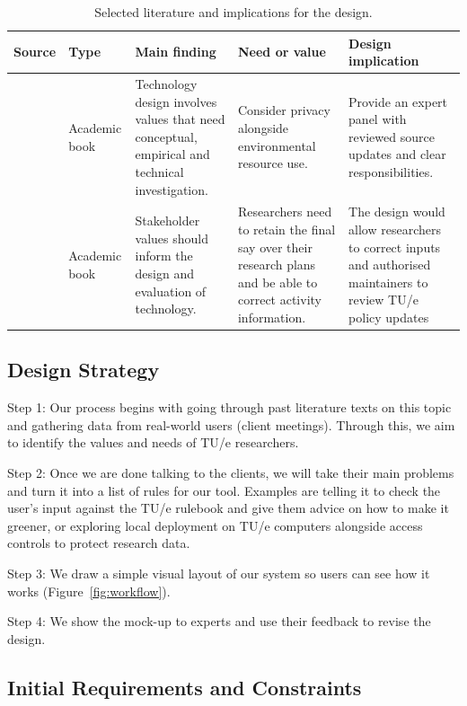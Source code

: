 \begin{table}[htbp]
\centering
\small
\begin{tabularx}{\textwidth}{@{}p{}p{}XXp{}@{}}
\toprule
Source & Type & Main finding & Need or value & Design implication \\
\midrule
\citet{friedman2019shaping}
& Academic book  
& Technology design involves values that need conceptual, empirical and technical investigation.
& Consider privacy alongside environmental resource use. 
& Provide an expert panel with reviewed source updates and clear responsibilities.  \\
\midrule
\citet{friedman2019shaping}
& Academic book
& Stakeholder values should inform the design and evaluation of technology. & Researchers need to retain the final say over their research plans and be able to correct activity information.
& The design would allow researchers to correct inputs and authorised maintainers to review TU/e policy updates \\
\bottomrule
\end{tabularx}
\caption{Selected literature and implications for the design.}
\label{tab:literature}

\end{table}

\FloatBarrier
\subsection{Design Strategy}

Step 1: Our process begins with going through past literature texts on this topic and gathering data from real-world users (client meetings). Through this, we aim to identify the values and needs of TU/e researchers.

Step 2: Once we are done talking to the clients, we will take their main problems and turn it into a list of rules for our tool. Examples are telling it to check the user's input against the TU/e rulebook and give them advice on how to make it greener, or exploring local deployment on TU/e computers alongside access controls to protect research data.

Step 3: We draw a simple visual layout of our system so users can see how it works (Figure~\ref{fig:workflow}).

Step 4: We show the mock-up to experts and use their feedback to revise the design.


\FloatBarrier
\subsection{Initial Requirements and Constraints}

